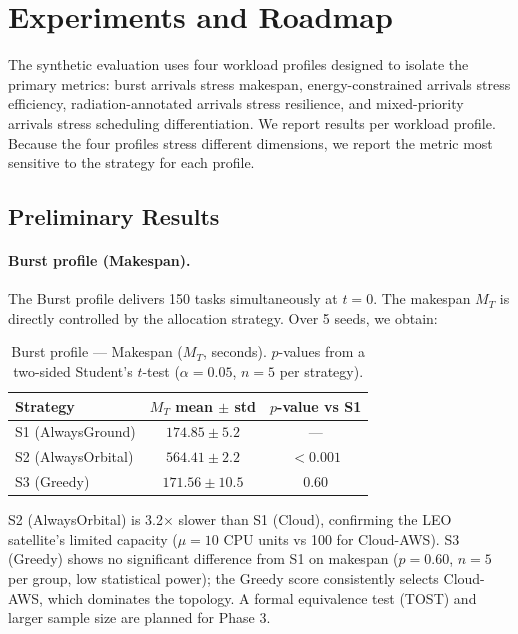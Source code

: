 \documentclass[conference]{IEEEtran}
\begin{document}
\section{Experiments and Roadmap}
\label{sec:experiments}

The synthetic evaluation uses four workload profiles designed to isolate the primary metrics: burst arrivals stress makespan, energy-constrained arrivals stress efficiency, radiation-annotated arrivals stress resilience, and mixed-priority arrivals stress scheduling differentiation. We report results per workload profile. Because the four profiles stress different dimensions, we report the metric most sensitive to the strategy for each profile.

\subsection{Preliminary Results}
\label{sec:results}

\paragraph{Burst profile (Makespan).}
The Burst profile delivers 150 tasks simultaneously at $t=0$. The makespan $M_T$ is directly controlled by the allocation strategy. Over 5 seeds, we obtain:

\begin{table}[h!]
\centering
\caption{Burst profile --- Makespan ($M_T$, seconds). $p$-values from a two-sided Student's $t$-test ($\alpha=0.05$, $n=5$ per strategy).}
\begin{tabular}{l c c}
\toprule
\textbf{Strategy} & \textbf{$M_T$ mean $\pm$ std} & \textbf{$p$-value vs S1} \\
\midrule
S1 (AlwaysGround)  & $174.85 \pm 5.2$  & --- \\
S2 (AlwaysOrbital) & $564.41 \pm 2.2$  & $<0.001$ \\
S3 (Greedy)        & $171.56 \pm 10.5$ & $0.60$ \\
\bottomrule
\end{tabular}
\label{tab:burst}
\end{table}

S2 (AlwaysOrbital) is 3.2$\times$ slower than S1 (Cloud), confirming the LEO satellite's limited capacity ($\mu=10$ CPU units vs 100 for Cloud-AWS). S3 (Greedy) shows no significant difference from S1 on makespan ($p = 0.60$, $n=5$ per group, low statistical power); the Greedy score consistently selects Cloud-AWS, which dominates the topology. A formal equivalence test (TOST) and larger sample size are planned for Phase 3.
\end{document}
